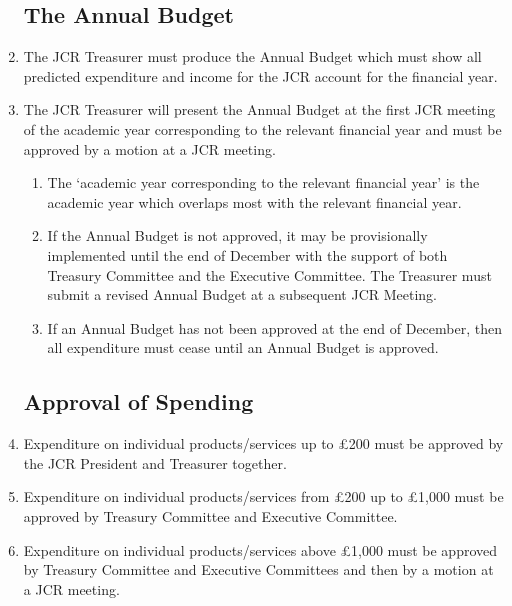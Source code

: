 \documentclass[12pt]{article}  %
\begin{document}
\begin{enumerate}
	\subsection{The Annual Budget}
	\item The JCR Treasurer must produce the Annual Budget which must show all predicted expenditure and income for the JCR account for the financial year.
	\item The JCR Treasurer will present the Annual Budget at the first JCR meeting of the academic year corresponding to the relevant financial year and must be approved by a motion at a JCR meeting.
	\begin{enumerate}
		\item The ‘academic year corresponding to the relevant financial year’ is the academic year which overlaps most with the relevant financial year.
		\item If the Annual Budget is not approved, it may be provisionally implemented until the end of December with the support of both Treasury Committee and the Executive Committee. The Treasurer must submit a revised Annual Budget at a subsequent JCR Meeting.
		\item If an Annual Budget has not been approved at the end of December, then all expenditure must cease until an Annual Budget is approved.
	\end{enumerate}
	\subsection{Approval of Spending}
	\item Expenditure on individual products/services up to £200 must be approved by the JCR President and Treasurer together.
	\item Expenditure on individual products/services from £200 up to £1,000 must be approved by Treasury Committee and Executive Committee.
	\item Expenditure on individual products/services above £1,000 must be approved by Treasury Committee and Executive Committees and then by a motion at a JCR meeting.

\end{enumerate}
\end{document}
